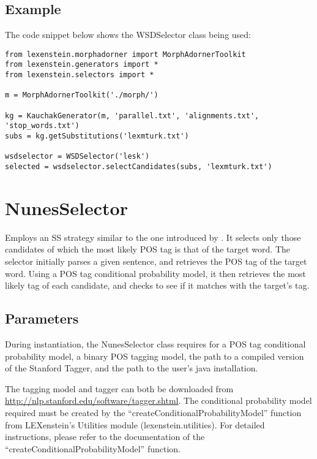 \subsection{Example}

The code snippet below shows the WSDSelector class being used:

\begin{lstlisting}
from lexenstein.morphadorner import MorphAdornerToolkit
from lexenstein.generators import *
from lexenstein.selectors import *

m = MorphAdornerToolkit('./morph/')

kg = KauchakGenerator(m, 'parallel.txt', 'alignments.txt', 'stop_words.txt')
subs = kg.getSubstitutions('lexmturk.txt')

wsdselector = WSDSelector('lesk')
selected = wsdselector.selectCandidates(subs, 'lexmturk.txt')
\end{lstlisting}
















\section{NunesSelector}

Employs an SS strategy similar to the one introduced by \cite{Nunes2013}. It selects only those candidates of which the most likely POS tag is that of the target word. The selector initially parses a given sentence, and retrieves the POS tag of the target word. Using a POS tag conditional probability model, it then retrieves the most likely tag of each candidate, and checks to see if it matches with the target's tag.

\subsection{Parameters}

During instantiation, the NunesSelector class requires for a POS tag conditional probability model, a binary POS tagging model, the path to a compiled version of the Stanford Tagger, and the path to the user's java installation.

The tagging model and tagger can both be downloaded from \url{http://nlp.stanford.edu/software/tagger.shtml}. The conditional probability model required must be created by the ``createConditionalProbabilityModel'' function from LEXenstein's Utilities module (lexenstein.utilities). For detailed instructions, please refer to the documentation of the ``createConditionalProbabilityModel'' function.

